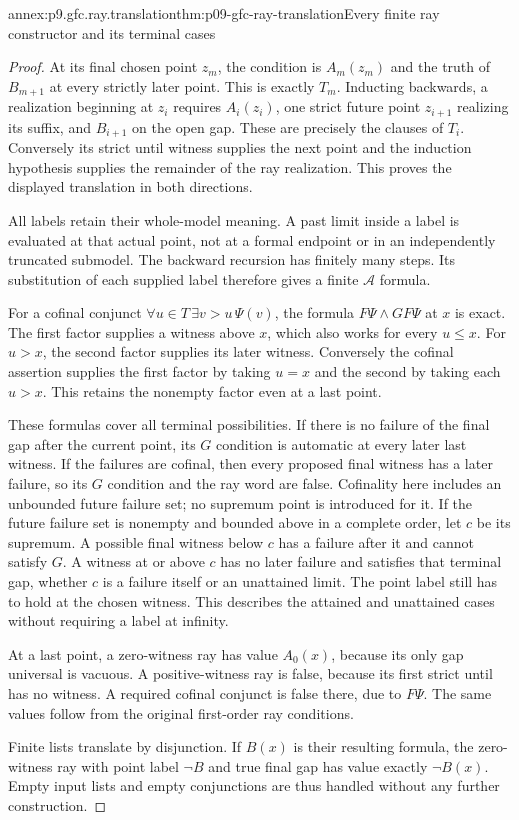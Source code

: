 \begin{annexitem}{annex:p9.gfc.ray.translation}{thm:p09-gfc-ray-translation}{Every finite ray constructor and its terminal cases}
\begin{proof}
At its final chosen point \(z_m\), the condition is
\(A_m(z_m)\) and the truth of \(B_{m+1}\) at every
strictly later point. This is exactly \(T_m\).
Inducting backwards, a realization beginning at
\(z_i\) requires \(A_i(z_i)\), one strict future
point \(z_{i+1}\) realizing its suffix, and \(B_{i+1}\)
on the open gap. These are precisely the clauses of
\(T_i\). Conversely its strict until witness supplies
the next point and the induction hypothesis supplies
the remainder of the ray realization. This proves
the displayed translation in both directions.

All labels retain their whole-model meaning. A past
limit inside a label is evaluated at that actual point,
not at a formal endpoint or in an independently
truncated submodel. The backward recursion has
finitely many steps. Its substitution of each supplied
label therefore gives a finite \(\mathcal A\) formula.

For a cofinal conjunct
\(\forall u\in T\,\exists v>u\,\Psi(v)\), the formula
\(F\Psi\land GF\Psi\) at \(x\) is exact. The
first factor supplies a witness above \(x\), which
also works for every \(u\leq x\). For \(u>x\),
the second factor supplies its later witness.
Conversely the cofinal assertion supplies the
first factor by taking \(u=x\) and the second
by taking each \(u>x\). This retains the
nonempty factor even at a last point.

These formulas cover all terminal possibilities.
If there is no failure of the final gap after
the current point, its \(G\) condition is
automatic at every later last witness.
If the failures are cofinal, then every
proposed final witness has a later failure,
so its \(G\) condition and the ray word
are false. Cofinality here includes an
unbounded future failure set; no supremum
point is introduced for it. If the future
failure set is nonempty and bounded above
in a complete order, let \(c\) be its
supremum. A possible final witness below
\(c\) has a failure after it and cannot
satisfy \(G\). A witness at or above
\(c\) has no later failure and satisfies
that terminal gap, whether \(c\) is a
failure itself or an unattained limit.
The point label still has to hold at
the chosen witness. This describes the
attained and unattained cases without
requiring a label at infinity.

At a last point, a zero-witness ray has
value \(A_0(x)\), because its only gap
universal is vacuous. A positive-witness
ray is false, because its first strict
until has no witness. A required cofinal
conjunct is false there, due to \(F\Psi\).
The same values follow from the original
first-order ray conditions.

Finite lists translate by disjunction.
If \(B(x)\) is their resulting formula,
the zero-witness ray with point label
\(\neg B\) and true final gap has value
exactly \(\neg B(x)\). Empty input
lists and empty conjunctions are thus
handled without any further construction.
\end{proof}
\end{annexitem}


